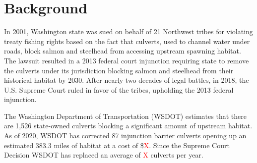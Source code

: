 \documentclass[12pt]{elsarticle}
\begin{document}


\section{Background} %

In 2001, Washington state was sued on behalf of 21 Northwest tribes for violating treaty fishing rights based on the fact that culverts, used to channel water under roads, block salmon and steelhead from accessing upstream spawning habitat. The lawsuit resulted in a 2013 federal court injunction requiring state to remove the culverts under its jurisdiction blocking salmon and steelhead from their historical habitat by 2030. After nearly two decades of legal battles, in 2018, the U.S. Supreme Court ruled in favor of the tribes, upholding the 2013 federal injunction. 

The Washington Department of Transportation (WSDOT) estimates that there are 1,526 state-owned culverts blocking a significant amount of upstream habitat. As of 2020, WSDOT has corrected 87 injunction barrier culverts opening up an estimated 383.3 miles of habitat at a cost of \$\textcolor{red}{X}. Since the Supreme Court Decision WSDOT has replaced an average of \textcolor{red}{X} culverts per year. 
\end{document}
